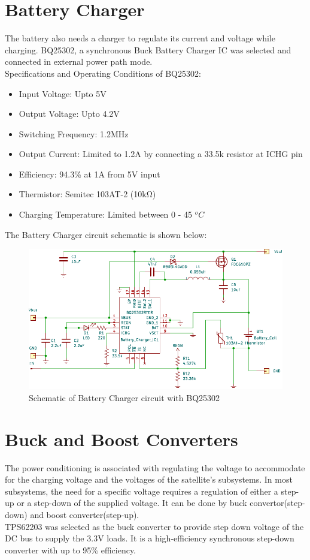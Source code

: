 \section[Battery Charger]{Battery Charger}
 The battery also needs a charger to regulate its current and voltage while charging.
 BQ25302, a synchronous Buck Battery Charger IC was selected and connected in external power path mode.\\
 
 
 Specifications and Operating Conditions of BQ25302:
\begin{itemize}
 	\item Input Voltage: Upto 5V
 	\item Output Voltage: Upto 4.2V
 	\item Switching Frequency: 1.2MHz
 	\item Output Current: Limited to 1.2A by connecting a 33.5k resistor at ICHG pin 
 	\item Efficiency: 94.3\% at 1A from 5V input 
 	\item Thermistor: Semitec 103AT-2 (10\si{\kilo\ohm})
 	\item Charging Temperature: Limited between 0 - 45 $^{o}C$
 \end{itemize}

The Battery Charger circuit schematic is shown below:
\begin{figure}[ht]
	\centering
	\includegraphics[width=\columnwidth]{batt2.pdf}
	\caption{Schematic of Battery Charger circuit with BQ25302}
	\label{fig:battch}
\end{figure}


\section[Switching Regulators]{Buck and Boost Converters}
The power conditioning is associated with regulating the voltage to accommodate
for the charging voltage and the voltages of the satellite's subsystems. In most
subsystems, the need for a specific voltage requires a regulation of either a step-up
or a step-down of the supplied voltage. It can be done by buck
convertor(step-down) and boost converter(step-up).\\
TPS62203 was selected as the buck converter to provide step down voltage of the DC bus to supply the 3.3V loads. It is a high-efficiency synchronous step-down converter with up to 95\% efficiency.\\

